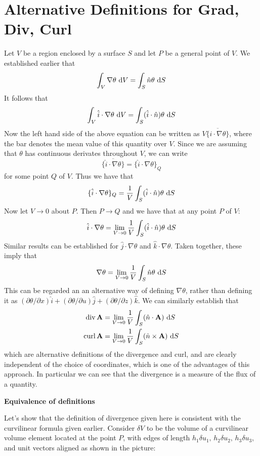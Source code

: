 \section{Alternative Definitions for Grad, Div, Curl}
Let $V$ be a region enclosed by a surface $S$ and let $P$ be a general point of $V$. We established earlier that 
\[
  \int_V \nabla \theta\,\d V =\int_S \hat n \theta \,\d S
\]
 It follows that 
\[
  \int_V \hat i \cdot \nabla \theta \,\d V = 
  \int_S (\hat i \cdot \hat n)\theta \,\d S
\]
Now the left hand side of the above equation  can be written as 
$V\{\overline{\hat i \cdot \nabla \theta}\}$, where the bar denotes the mean value of 
this quantity over $V$. Since we are assuming that $\theta$ has continuous
derivates throughout $V$, we can write
\[
  \{\overline{\hat i \cdot \nabla\theta}\} = \{\hat i \cdot \nabla \theta\}_Q
\]
for some point $Q$ of $V$. Thus we have that
\[
  \{\hat i \cdot \nabla\theta\}_Q = \dfrac{1}{V} \int_S (\hat i \cdot \hat n)\theta \,\d S
\]
Now let $V \to 0$ about $P$. Then $P \to Q$ and we have that at any point $P$ of $V$:
\[
  \hat i \cdot \nabla \theta = \lim_{V \to 0}\dfrac{1}{V}\int_S(\hat i \cdot \hat n)\theta\,\d S
\]
Similar results can be established for $\hat j \cdot \nabla \theta$ and $\hat k \cdot \nabla \theta$. Taken together, these imply that 
\[
  \nabla \theta = \lim_{V \to 0}\dfrac{1}{V} \int_S \hat n \theta\,\d S 
\]
This can be regarded an an alternative way of defining $\nabla \theta$, rather than defining it as $(\partial \theta/ \partial x)\hat i + (\partial \theta/\partial u)\hat j + (\partial \theta/\partial z)\hat k$. We can similarly establish that 
\begin{align*}
  \mathrm{div}\,\mathbf A &= \lim_{V \to 0}\dfrac{1}{V}\int_S(\hat n\cdot \mathbf A)\,\d S\\
  \mathrm{curl}\,\mathbf A &= \lim_{V \to 0}\dfrac{1}{V}\int_S(\hat n \times \mathbf A)\,\d S
\end{align*}
which are alternative definitions of the divergence and curl, and are clearly independent of the 
choice of coordinates, which is one of the advantages of this approach. 
In particular we can see that the divergence is a measure of the flux of a quantity. 

\textbf{Equivalence of definitions}

Let’s show that the definition of divergence given here is consistent with the curvilinear formula given
earlier.
 Consider $\delta V$ to be the volume of a curvilinear volume element located at the point $P$, 
 with edges of length $h_1\delta u_1,\, h_2\delta u_2,\, h_3\delta u_3$, and unit vectors aligned as shown in the picture:


